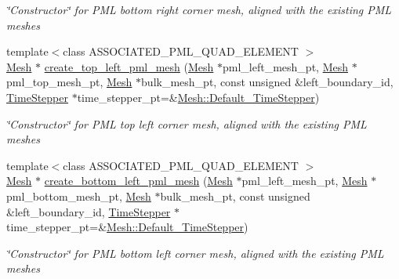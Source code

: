 \begin{DoxyCompactItemize}
\begin{DoxyCompactList}\small\item\em \char`\"{}\+Constructor\char`\"{} for P\+ML bottom right corner mesh, aligned with the existing P\+ML meshes \end{DoxyCompactList}\item 
{\footnotesize template$<$class A\+S\+S\+O\+C\+I\+A\+T\+E\+D\+\_\+\+P\+M\+L\+\_\+\+Q\+U\+A\+D\+\_\+\+E\+L\+E\+M\+E\+NT $>$ }\\\hyperlink{classoomph_1_1Mesh}{Mesh} $\ast$ \hyperlink{namespaceoomph_1_1TwoDimensionalPMLHelper_a60f24bcfa2ad065577e47d97015995ac}{create\+\_\+top\+\_\+left\+\_\+pml\+\_\+mesh} (\hyperlink{classoomph_1_1Mesh}{Mesh} $\ast$pml\+\_\+left\+\_\+mesh\+\_\+pt, \hyperlink{classoomph_1_1Mesh}{Mesh} $\ast$pml\+\_\+top\+\_\+mesh\+\_\+pt, \hyperlink{classoomph_1_1Mesh}{Mesh} $\ast$bulk\+\_\+mesh\+\_\+pt, const unsigned \&left\+\_\+boundary\+\_\+id, \hyperlink{classoomph_1_1TimeStepper}{Time\+Stepper} $\ast$time\+\_\+stepper\+\_\+pt=\&\hyperlink{classoomph_1_1Mesh_a12243d0fee2b1fcee729ee5a4777ea10}{Mesh\+::\+Default\+\_\+\+Time\+Stepper})
\begin{DoxyCompactList}\small\item\em \char`\"{}\+Constructor\char`\"{} for P\+ML top left corner mesh, aligned with the existing P\+ML meshes \end{DoxyCompactList}\item 
{\footnotesize template$<$class A\+S\+S\+O\+C\+I\+A\+T\+E\+D\+\_\+\+P\+M\+L\+\_\+\+Q\+U\+A\+D\+\_\+\+E\+L\+E\+M\+E\+NT $>$ }\\\hyperlink{classoomph_1_1Mesh}{Mesh} $\ast$ \hyperlink{namespaceoomph_1_1TwoDimensionalPMLHelper_aba3dace3fd7f0d481d986e6cc98c770f}{create\+\_\+bottom\+\_\+left\+\_\+pml\+\_\+mesh} (\hyperlink{classoomph_1_1Mesh}{Mesh} $\ast$pml\+\_\+left\+\_\+mesh\+\_\+pt, \hyperlink{classoomph_1_1Mesh}{Mesh} $\ast$pml\+\_\+bottom\+\_\+mesh\+\_\+pt, \hyperlink{classoomph_1_1Mesh}{Mesh} $\ast$bulk\+\_\+mesh\+\_\+pt, const unsigned \&left\+\_\+boundary\+\_\+id, \hyperlink{classoomph_1_1TimeStepper}{Time\+Stepper} $\ast$time\+\_\+stepper\+\_\+pt=\&\hyperlink{classoomph_1_1Mesh_a12243d0fee2b1fcee729ee5a4777ea10}{Mesh\+::\+Default\+\_\+\+Time\+Stepper})
\begin{DoxyCompactList}\small\item\em \char`\"{}\+Constructor\char`\"{} for P\+ML bottom left corner mesh, aligned with the existing P\+ML meshes \end{DoxyCompactList}\end{DoxyCompactItemize}


